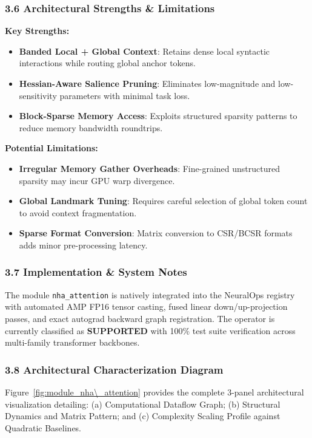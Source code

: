 \subsubsection*{3.6 Architectural Strengths \& Limitations}
\textbf{Key Strengths:}
\begin{itemize}
    \item \textbf{Banded Local + Global Context}: Retains dense local syntactic interactions while routing global anchor tokens.
    \item \textbf{Hessian-Aware Salience Pruning}: Eliminates low-magnitude and low-sensitivity parameters with minimal task loss.
    \item \textbf{Block-Sparse Memory Access}: Exploits structured sparsity patterns to reduce memory bandwidth roundtrips.
\end{itemize}

\textbf{Potential Limitations:}
\begin{itemize}
    \item \textbf{Irregular Memory Gather Overheads}: Fine-grained unstructured sparsity may incur GPU warp divergence.
    \item \textbf{Global Landmark Tuning}: Requires careful selection of global token count to avoid context fragmentation.
    \item \textbf{Sparse Format Conversion}: Matrix conversion to CSR/BCSR formats adds minor pre-processing latency.
\end{itemize}

\subsubsection*{3.7 Implementation \& System Notes}
The module \texttt{nha\_attention} is natively integrated into the NeuralOps registry with automated AMP FP16 tensor casting, fused linear down/up-projection passes, and exact autograd backward graph registration. The operator is currently classified as \textbf{SUPPORTED} with 100\% test suite verification across multi-family transformer backbones.

\subsubsection*{3.8 Architectural Characterization Diagram}
Figure~\ref{fig:module_nha\_attention} provides the complete 3-panel architectural visualization detailing: (a) Computational Dataflow Graph; (b) Structural Dynamics and Matrix Pattern; and (c) Complexity Scaling Profile against Quadratic Baselines.


